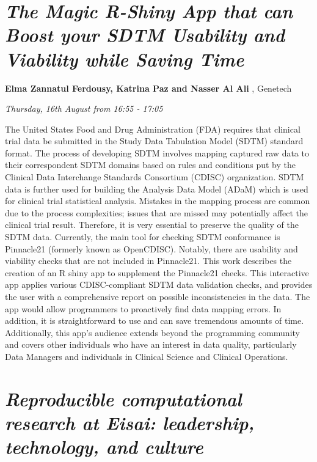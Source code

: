 \documentclass[]{book}
\theoremstyle{definition}
\theoremstyle{definition}
\theoremstyle{definition}
\theoremstyle{remark}
\begin{document}
\hypertarget{the-magic-r-shiny-app-that-can-boost-your-sdtm-usability-and-viability-while-saving-time-1}{%
\section{\texorpdfstring{\emph{The Magic R-Shiny App that can Boost your
SDTM Usability and Viability while Saving
Time}}{The Magic R-Shiny App that can Boost your SDTM Usability and Viability while Saving Time}}\label{the-magic-r-shiny-app-that-can-boost-your-sdtm-usability-and-viability-while-saving-time-1}}

\textbf{Elma Zannatul Ferdousy, Katrina Paz and Nasser Al Ali },
Genetech

\emph{Thursday, 16th August from 16:55 - 17:05}

The United States Food and Drug Administration (FDA) requires that
clinical trial data be submitted in the Study Data Tabulation Model
(SDTM) standard format. The process of developing SDTM involves mapping
captured raw data to their correspondent SDTM domains based on rules and
conditions put by the Clinical Data Interchange Standards Consortium
(CDISC) organization. SDTM data is further used for building the
Analysis Data Model (ADaM) which is used for clinical trial statistical
analysis. Mistakes in the mapping process are common due to the process
complexities; issues that are missed may potentially affect the clinical
trial result. Therefore, it is very essential to preserve the quality of
the SDTM data. Currently, the main tool for checking SDTM conformance is
Pinnacle21 (formerly known as OpenCDISC). Notably, there are usability
and viability checks that are not included in Pinnacle21. This work
describes the creation of an R shiny app to supplement the Pinnacle21
checks. This interactive app applies various CDISC-compliant SDTM data
validation checks, and provides the user with a comprehensive report on
possible inconsistencies in the data. The app would allow programmers to
proactively find data mapping errors. In addition, it is straightforward
to use and can save tremendous amounts of time. Additionally, this app's
audience extends beyond the programming community and covers other
individuals who have an interest in data quality, particularly Data
Managers and individuals in Clinical Science and Clinical Operations.

\hypertarget{reproducible-computational-research-at-eisai-leadership-technology-and-culture-1}{%
\section{\texorpdfstring{\emph{Reproducible computational research at
Eisai: leadership, technology, and
culture}}{Reproducible computational research at Eisai: leadership, technology, and culture}}\label{reproducible-computational-research-at-eisai-leadership-technology-and-culture-1}}
\end{document}
